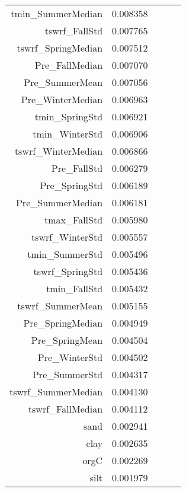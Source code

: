 \begin{tabular}{rrrrr}
tmin_SummerMedian & 0.008358 \\
tswrf_FallStd & 0.007765 \\
tswrf_SpringMedian & 0.007512 \\
Pre_FallMedian & 0.007070 \\
Pre_SummerMean & 0.007056 \\
Pre_WinterMedian & 0.006963 \\
tmin_SpringStd & 0.006921 \\
tmin_WinterStd & 0.006906 \\
tswrf_WinterMedian & 0.006866 \\
Pre_FallStd & 0.006279 \\
Pre_SpringStd & 0.006189 \\
Pre_SummerMedian & 0.006181 \\
tmax_FallStd & 0.005980 \\
tswrf_WinterStd & 0.005557 \\
tmin_SummerStd & 0.005496 \\
tswrf_SpringStd & 0.005436 \\
tmin_FallStd & 0.005432 \\
tswrf_SummerMean & 0.005155 \\
Pre_SpringMedian & 0.004949 \\
Pre_SpringMean & 0.004504 \\
Pre_WinterStd & 0.004502 \\
Pre_SummerStd & 0.004317 \\
tswrf_SummerMedian & 0.004130 \\
tswrf_FallMedian & 0.004112 \\
sand & 0.002941 \\
clay & 0.002635 \\
orgC & 0.002269 \\
silt & 0.001979 \\
\bottomrule
\end{tabular}
